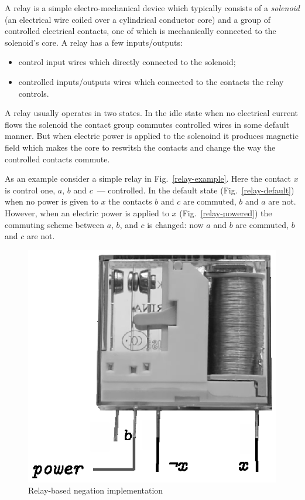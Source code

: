 A relay is a simple electro-mechanical device which typically consists of a \emph{solenoid} (an electrical wire coiled over
a cylindrical conductor core) and a group of controlled electrical contacts, one of which is mechanically connected to the solenoid's core.
A relay has a few inputs/outputs:

\begin{itemize}
\item control input wires which directly connected to the solenoid;
\item controlled inputs/outputs wires which connected to the contacts the relay controls.
\end{itemize}

A relay usually operates in two states. In the idle state when no electrical current flows the solenoid the contact group commutes
controlled wires in some default manner. But when electric power is applied to the solenoind it produces magnetic field which
makes the core to reswitsh the contacts and change the way the controlled contacts commute.

As an example consider a simple relay in Fig.~\ref{relay-example}. Here the contact $x$ is control one, $a$, $b$ and $c$~--- controlled.
In the default state (Fig.~\ref{relay-default}) when no power is given to $x$ the contacts $b$ and $c$ are commuted, $b$ and $a$ are not.
However, when an electric power is applied to $x$ (Fig.~\ref{relay-powered}) the commuting scheme between $a$, $b$, and $c$ is
changed: now $a$ and $b$ are commuted, $b$ and $c$ are not.

\begin{figure}[t]
  \centering
  \includegraphics{images/06-08.eps}
  \caption{Relay-based negation implementation}
  \label{relay-negation}
\end{figure}

